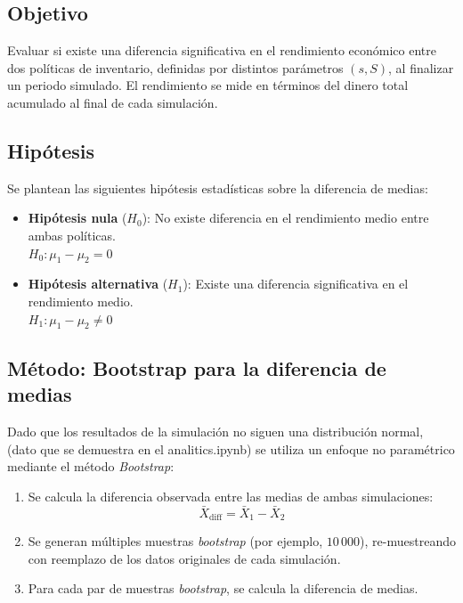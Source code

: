 \documentclass{article}
\begin{document}
\begin{itemize}
\subsection*{Objetivo}

Evaluar si existe una diferencia significativa en el rendimiento económico entre dos políticas de inventario, definidas por distintos parámetros $(s, S)$, al finalizar un periodo simulado. El rendimiento se mide en términos del dinero total acumulado al final de cada simulación.

\subsection*{Hipótesis}

Se plantean las siguientes hipótesis estadísticas sobre la diferencia de medias:

\begin{itemize}
    \item \textbf{Hipótesis nula} ($H_0$): No existe diferencia en el rendimiento medio entre ambas políticas.\\
    $H_0: \mu_1 - \mu_2 = 0$
    
    \item \textbf{Hipótesis alternativa} ($H_1$): Existe una diferencia significativa en el rendimiento medio.\\
    $H_1: \mu_1 - \mu_2 \ne 0$
\end{itemize}

\subsection*{Método: Bootstrap para la diferencia de medias}

Dado que los resultados de la simulación no siguen una distribución normal, (dato que se demuestra en el analitics.ipynb) se utiliza un enfoque no paramétrico mediante el método \textit{Bootstrap}:

\begin{enumerate}
    \item Se calcula la diferencia observada entre las medias de ambas simulaciones:
    \[
    \bar{X}_{\text{diff}} = \bar{X}_1 - \bar{X}_2
    \]
    
    \item Se generan múltiples muestras \textit{bootstrap} (por ejemplo, $10\,000$), re-muestreando con reemplazo de los datos originales de cada simulación.
    
    \item Para cada par de muestras \textit{bootstrap}, se calcula la diferencia de medias.
    

\end{enumerate}
\end{itemize}
\end{document}
